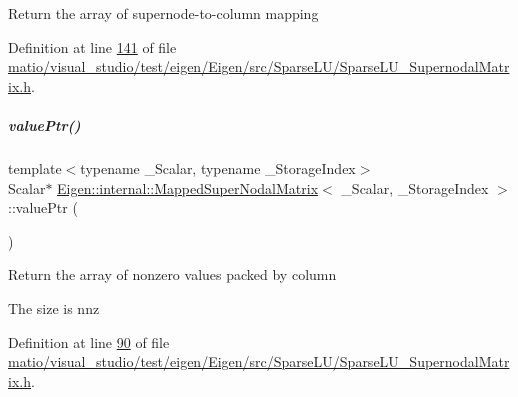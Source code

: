 Return the array of supernode-\/to-\/column mapping 

Definition at line \hyperlink{matio_2visual__studio_2test_2eigen_2_eigen_2src_2_sparse_l_u_2_sparse_l_u___supernodal_matrix_8h_source_l00141}{141} of file \hyperlink{matio_2visual__studio_2test_2eigen_2_eigen_2src_2_sparse_l_u_2_sparse_l_u___supernodal_matrix_8h_source}{matio/visual\+\_\+studio/test/eigen/\+Eigen/src/\+Sparse\+L\+U/\+Sparse\+L\+U\+\_\+\+Supernodal\+Matrix.\+h}.

\mbox{\label{group___sparse_l_u___module_a6e9ce7d448b76811802d11baf3da97d3}} 
\subparagraph{\texorpdfstring{value\+Ptr()}{valuePtr()}\hspace{0.1cm}{\footnotesize\ttfamily [1/2]}}
{\footnotesize\ttfamily template$<$typename \+\_\+\+Scalar, typename \+\_\+\+Storage\+Index$>$ \\
Scalar$\ast$ \hyperlink{group___sparse_l_u___module_class_eigen_1_1internal_1_1_mapped_super_nodal_matrix}{Eigen\+::internal\+::\+Mapped\+Super\+Nodal\+Matrix}$<$ \+\_\+\+Scalar, \+\_\+\+Storage\+Index $>$\+::value\+Ptr (\begin{DoxyParamCaption}{ }\end{DoxyParamCaption})\hspace{0.3cm}{\ttfamily [inline]}}

Return the array of nonzero values packed by column

The size is nnz 

Definition at line \hyperlink{matio_2visual__studio_2test_2eigen_2_eigen_2src_2_sparse_l_u_2_sparse_l_u___supernodal_matrix_8h_source_l00090}{90} of file \hyperlink{matio_2visual__studio_2test_2eigen_2_eigen_2src_2_sparse_l_u_2_sparse_l_u___supernodal_matrix_8h_source}{matio/visual\+\_\+studio/test/eigen/\+Eigen/src/\+Sparse\+L\+U/\+Sparse\+L\+U\+\_\+\+Supernodal\+Matrix.\+h}.

